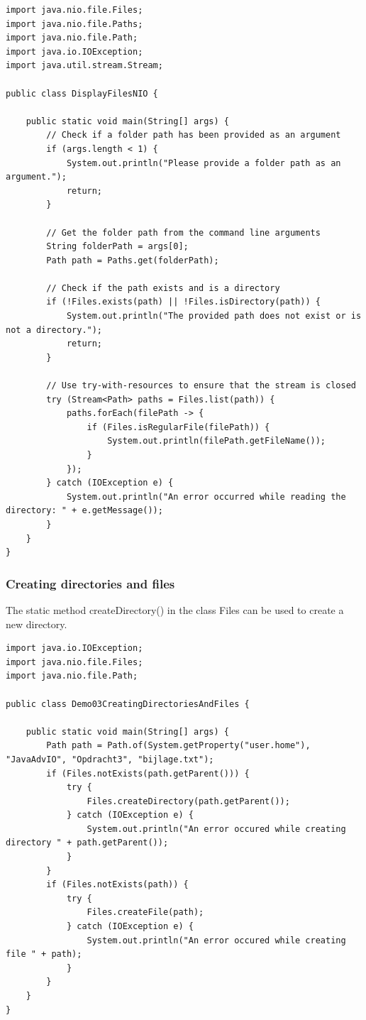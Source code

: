 \begin{lstlisting}
import java.nio.file.Files;
import java.nio.file.Paths;
import java.nio.file.Path;
import java.io.IOException;
import java.util.stream.Stream;

public class DisplayFilesNIO {

    public static void main(String[] args) {
        // Check if a folder path has been provided as an argument
        if (args.length < 1) {
            System.out.println("Please provide a folder path as an argument.");
            return;
        }

        // Get the folder path from the command line arguments
        String folderPath = args[0];
        Path path = Paths.get(folderPath);

        // Check if the path exists and is a directory
        if (!Files.exists(path) || !Files.isDirectory(path)) {
            System.out.println("The provided path does not exist or is not a directory.");
            return;
        }

        // Use try-with-resources to ensure that the stream is closed
        try (Stream<Path> paths = Files.list(path)) {
            paths.forEach(filePath -> {
                if (Files.isRegularFile(filePath)) {
                    System.out.println(filePath.getFileName());
                }
            });
        } catch (IOException e) {
            System.out.println("An error occurred while reading the directory: " + e.getMessage());
        }
    }
}
\end{lstlisting}


\subsubsection{Creating directories and files}

The static method createDirectory() in the class Files can be used to create a new directory.

\begin{lstlisting}
import java.io.IOException;
import java.nio.file.Files;
import java.nio.file.Path;

public class Demo03CreatingDirectoriesAndFiles {

	public static void main(String[] args) {
		Path path = Path.of(System.getProperty("user.home"), "JavaAdvIO", "Opdracht3", "bijlage.txt");
		if (Files.notExists(path.getParent())) {
			try {
				Files.createDirectory(path.getParent());
			} catch (IOException e) {
				System.out.println("An error occured while creating directory " + path.getParent());
			}
		}
		if (Files.notExists(path)) {
			try {
				Files.createFile(path);
			} catch (IOException e) {
				System.out.println("An error occured while creating file " + path);
			}
		}
	}
}
\end{lstlisting}



